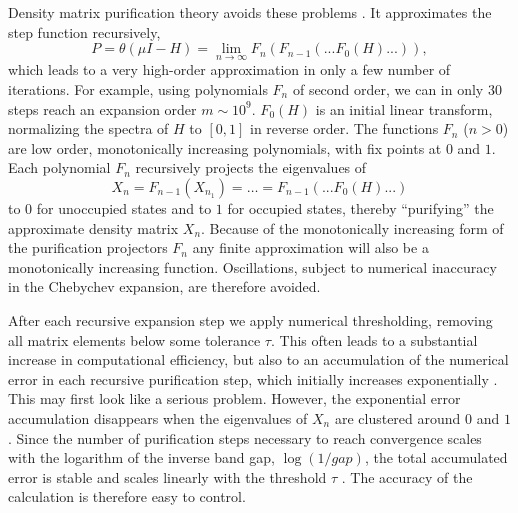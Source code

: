 \documentclass[twocolumn,showpacs,preprintnumbers,amsmath,amssymb]{revtex4}
\begin{document}
Density matrix purification theory avoids these problems
\cite{McWeeny60,Clinton69,Palser98,Holas01,NiklassonTC2,NiklassonTRS4,NiklassonIPUR,Mazziotti03,NiklassonPRT1}.
It approximates the step function recursively,
\begin{equation}\label{Rec}
 P = \theta(\mu I -H) = \lim_{n \rightarrow \infty} F_n(F_{n-1}(...F_0(H)...)),
\end{equation}
which leads to a very high-order approximation in only a few number of iterations.
For example, using polynomials $F_n$ of second order, we can in only 30 steps reach an
expansion order $m \sim 10^9$.
$F_0(H)$ is an initial linear transform, normalizing
the spectra of $H$ to $[0,1]$ in reverse order. The functions $F_n$ ($n>0$) are low order,
monotonically increasing polynomials, with fix points at $0$ and $1$. Each
polynomial $F_n$ recursively projects the eigenvalues of 
\begin{equation}
X_n = F_{n-1}(X_{n_1})= \ldots = F_{n-1}(...F_0(H)...)
\end{equation}
to $0$ for unoccupied states and to $1$ for occupied states, thereby ``purifying'' the approximate 
density matrix $X_n$.  Because of the monotonically increasing form of the purification projectors $F_n$ any 
finite approximation will also be a monotonically increasing function. Oscillations, subject to numerical
inaccuracy in the Chebychev expansion, are therefore avoided.

After each recursive expansion step we apply numerical thresholding, removing all matrix elements below
some tolerance $\tau$. This often leads to a substantial increase in computational efficiency, but also
to an accumulation of the numerical error in each recursive purification step, which initially increases
exponentially \cite{NiklassonTRS4}. This may first look like a serious problem. However, the exponential 
error accumulation disappears when the eigenvalues of $X_n$ are clustered around $0$ and $1$. Since the 
number of purification steps necessary to reach convergence scales with the logarithm of the inverse
band gap, $\log ( 1/gap)$, the total accumulated error is stable and scales linearly with 
the threshold $\tau$ \cite{NiklassonTRS4}. The accuracy of the calculation is therefore easy
to control.
\end{document}
